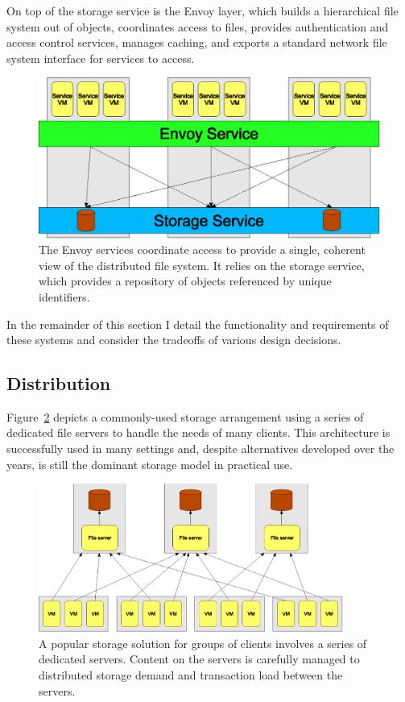 On top of the storage service is the Envoy layer, which builds a hierarchical file system out of objects, coordinates access to files, provides authentication and access control services, manages caching, and exports a standard network file system interface for services to access.

\begin{figure}[tp]
\centering
\includegraphics{figures/layers}
\caption{The Envoy services coordinate access to provide a single, coherent view of the distributed file system. It relies on the storage service, which provides a repository of objects referenced by unique identifiers.}
\label{fig:layers}
\end{figure}

In the remainder of this section I detail the functionality and requirements of these systems and consider the tradeoffs of various design decisions.

\subsection{Distribution}

Figure~\ref{fig:client-server} depicts a commonly-used storage arrangement using a series of dedicated file servers to handle the needs of many clients. This architecture is successfully used in many settings and, despite alternatives developed over the years, is still the dominant storage model in practical use.

\begin{figure}[tp]
\centering
\includegraphics[width=100mm]{figures/client-server}
\caption{A popular storage solution for groups of clients involves a series of dedicated servers. Content on the servers is carefully managed to distributed storage demand and transaction load between the servers.}
\label{fig:client-server}
\end{figure}

